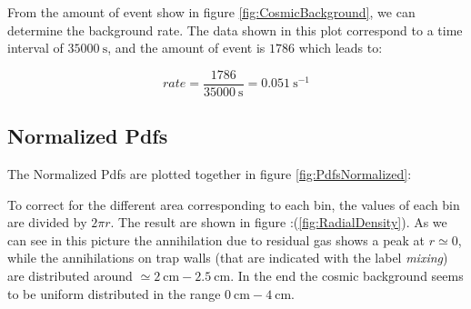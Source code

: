 \documentclass[11pt,a4paper,oneside]{article}
\begin{document}
From the amount of event show in figure \ref{fig:CosmicBackground}, we can determine the background rate. The data shown in this plot correspond to a time interval of $\SI{35000}{\second}$, and the amount of event is $1786$ which leads to:

\begin{equation} \label{eq:Rate}
rate = \frac{1786}{\SI{35000}{\second}} = \SI{0.051}{\second \tothe{-1}}
\end{equation}

\subsection{Normalized Pdfs}

The Normalized Pdfs are plotted together in figure \ref{fig:PdfsNormalized}:
\begin{figure}[!hbtp]
\centering
{}
\end{figure}

To correct for the different area corresponding to each bin, the values of each bin are divided by $ 2 \pi r$. The result are shown in figure :(\ref{fig:RadialDensity}). As we can see in this picture the annihilation due to residual gas shows a peak at $r \simeq 0$, while the annihilations on trap walls (that are indicated with the label \textit{mixing}) are distributed around $\simeq \SI{2}{ \centi \meter} - \SI{2.5}{\centi \meter}$. In the end the cosmic background seems to be uniform distributed in the range $\SI{0}{\centi \meter} - \SI{4}{\centi \meter}$.
\end{document}
